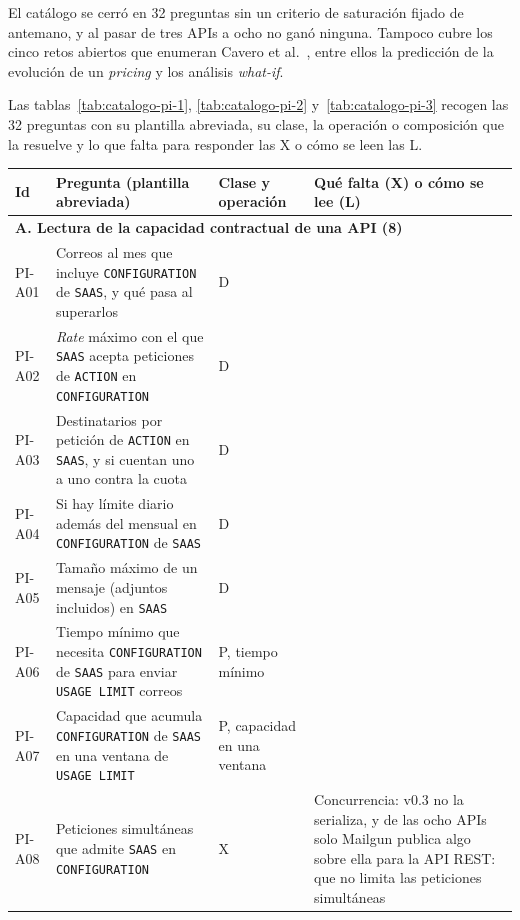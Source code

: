 El catálogo se cerró en 32 preguntas sin un criterio de saturación fijado de antemano, y al pasar de tres APIs a ocho no ganó ninguna.
Tampoco cubre los cinco retos abiertos que enumeran Cavero et al.\ \citep{cavero2026pricingintelligence}, entre ellos la predicción de la evolución de un \textit{pricing} y los análisis \textit{what-if}.

Las tablas~\ref{tab:catalogo-pi-1}, \ref{tab:catalogo-pi-2} y~\ref{tab:catalogo-pi-3} recogen las 32 preguntas con su plantilla abreviada, su clase, la operación o composición que la resuelve y lo que falta para responder las X o cómo se leen las L.

\begin{table}[htbp]
\centering
\scriptsize
\begin{tabular}{|l|>{\raggedright\arraybackslash}p{6.6cm}|>{\raggedright\arraybackslash}p{2.2cm}|>{\raggedright\arraybackslash}p{3.4cm}|}
\hline
\textbf{Id} & \textbf{Pregunta (plantilla abreviada)} & \textbf{Clase y operación} & \textbf{Qué falta (X) o cómo se lee (L)} \\
\hline
\multicolumn{4}{|l|}{\textbf{A. Lectura de la capacidad contractual de una API (8)}} \\
\hline
PI-A01 & Correos al mes que incluye \texttt{CONFIGURATION} de \texttt{SAAS}, y qué pasa al superarlos & D & \\
PI-A02 & \textit{Rate} máximo con el que \texttt{SAAS} acepta peticiones de \texttt{ACTION} en \texttt{CONFIGURATION} & D & \\
PI-A03 & Destinatarios por petición de \texttt{ACTION} en \texttt{SAAS}, y si cuentan uno a uno contra la cuota & D & \\
PI-A04 & Si hay límite diario además del mensual en \texttt{CONFIGURATION} de \texttt{SAAS} & D & \\
PI-A05 & Tamaño máximo de un mensaje (adjuntos incluidos) en \texttt{SAAS} & D & \\
PI-A06 & Tiempo mínimo que necesita \texttt{CONFIGURATION} de \texttt{SAAS} para enviar \texttt{USAGE LIMIT} correos & P, tiempo mínimo & \\
PI-A07 & Capacidad que acumula \texttt{CONFIGURATION} de \texttt{SAAS} en una ventana de \texttt{USAGE LIMIT} & P, capacidad en una ventana & \\
PI-A08 & Peticiones simultáneas que admite \texttt{SAAS} en \texttt{CONFIGURATION} & X & Concurrencia: v0.3 no la serializa, y de las ocho APIs solo Mailgun publica algo sobre ella para la API REST: que no limita las peticiones simultáneas \\

\end{tabular}
\end{table}
